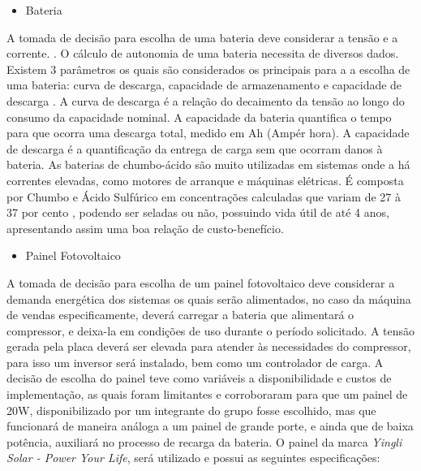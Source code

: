 \begin{itemize}
\item Bateria
\end{itemize}
	  
      A tomada de decisão para escolha de uma bateria deve considerar a tensão e a corrente.  \cite{de2011}. O cálculo de autonomia de uma bateria necessita de diversos dados. Existem 3 parâmetros os quais são considerados os principais para a a escolha de uma bateria: curva de descarga, capacidade de armazenamento e capacidade de descarga \cite{meggiolaro2006tutorial}. A curva de descarga é a relação do decaimento da tensão ao longo do consumo da capacidade nominal. A capacidade da bateria quantifica o tempo para que ocorra uma descarga total, medido em Ah (Ampér hora). A capacidade de descarga é a quantificação da entrega de carga sem que ocorram danos à bateria.
      As baterias de chumbo-ácido são muito utilizadas em sistemas onde a há correntes  elevadas, como motores de arranque e máquinas elétricas. É composta por Chumbo e Ácido Sulfúrico em concentrações calculadas que variam de 27 à 37 por cento \cite{de2005estudo}, podendo ser seladas ou não, possuindo vida útil de até 4 anos, apresentando assim uma boa relação de custo-benefício.
            
\begin{itemize}
\item Painel Fotovoltaico
\end{itemize}
		A tomada de decisão para escolha de um painel fotovoltaico deve considerar a demanda energética dos sistemas os quais serão alimentados, no caso da máquina de vendas especificamente, deverá carregar a bateria que alimentará o compressor, e deixa-la em condições de uso durante o período solicitado. A tensão gerada pela placa deverá ser elevada para atender às necessidades do compressor, para isso um inversor será instalado, bem como um controlador de carga. 
        A decisão de escolha do painel teve como variáveis a disponibilidade e custos de implementação, as quais foram limitantes e corroboraram para que um painel de 20W, disponibilizado por um integrante do grupo fosse escolhido, mas que funcionará de maneira análoga a um painel de grande porte, e ainda que de baixa potência,  auxiliará no processo de recarga da bateria.
        O painel da marca \textit{Yingli Solar - Power Your Life},  será utilizado e possui as seguintes especificações:
        
